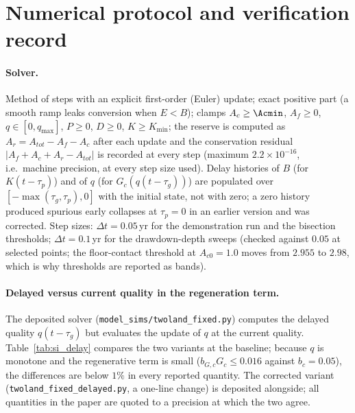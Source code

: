 \section{Numerical protocol and verification record}\label{si:numerics}

\paragraph{Solver.} Method of steps with an explicit first-order (Euler) update; exact positive part (a smooth ramp leaks conversion when $E<B$); clamps $A_c\ge\Acmin$, $A_f\ge0$, $q\in[0,q_{\max}]$, $P\ge0$, $D\ge0$, $K\ge K_{\min}$; the reserve is computed as $A_r=A_{tot}-A_f-A_c$ after each update and the conservation residual $|A_f+A_c+A_r-A_{tot}|$ is recorded at every step (maximum $2.2\times10^{-16}$, i.e.\ machine precision, at every step size used). Delay histories of $B$ (for $K(t-\tau_p)$) and of $q$ (for $G_c(q(t-\tau_g))$) are populated over $[-\max(\tau_g,\tau_p),0]$ with the initial state, not with zero; a zero history produced spurious early collapses at $\tau_p=0$ in an earlier version and was corrected. Step sizes: $\Delta t=0.05$\,yr for the demonstration run and the bisection thresholds; $\Delta t=0.1$\,yr for the drawdown-depth sweeps (checked against $0.05$ at selected points; the floor-contact threshold at $A_{c0}=1.0$ moves from $2.955$ to $2.98$, which is why thresholds are reported as bands).

\paragraph{Delayed versus current quality in the regeneration term.} The deposited solver (\texttt{model\_sims/twoland\_fixed.py}) computes the delayed quality $q(t-\tau_g)$ but evaluates the update of $q$ at the current quality. Table~\ref{tab:si_delay} compares the two variants at the baseline; because $q$ is monotone and the regenerative term is small ($b_{G,c}G_c\le0.016$ against $b_c=0.05$), the differences are below $1\%$ in every reported quantity. The corrected variant (\texttt{twoland\_fixed\_delayed.py}, a one-line change) is deposited alongside; all quantities in the paper are quoted to a precision at which the two agree.

